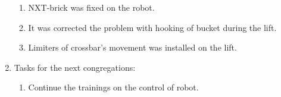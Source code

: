 \begin{enumerate}
\begin{enumerate}
	  \item NXT-brick was fixed on the robot.
	  
      \item It was corrected the problem with hooking of bucket during the lift.
      
      \item Limiters of crossbar's movement was installed on the lift.
      
    \end{enumerate}
    
	\item Tasks for the next congregations:
	\begin{enumerate}
	  \item Continue the trainings on the control of robot.
	  
    \end{enumerate}     
\end{enumerate}
\fillpage